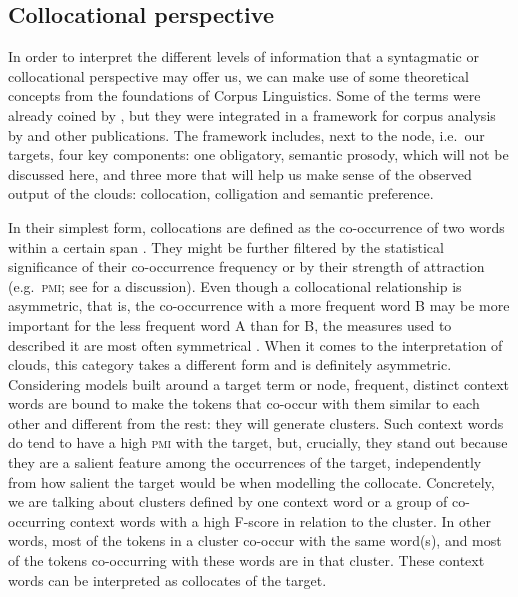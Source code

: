 \documentclass[
]{book}
\begin{document}
\hypertarget{collocationally}{%
\subsection{Collocational perspective}\label{collocationally}}

In order to interpret the different levels of information that a syntagmatic or collocational perspective may offer us, we can make use of some theoretical concepts from the foundations of Corpus Linguistics. Some of the terms were already coined by \textcite{firth_1957a}, but they were integrated in a framework for corpus analysis by \textcite[124-125]{sinclair_1998} and other publications. The framework includes, next to the node, i.e.~our targets, four key components: one obligatory, semantic prosody, which will not be discussed here, and three more that will help us make sense of the observed output of the clouds: collocation, colligation and semantic preference.

In their simplest form, collocations are defined as the co-occurrence of two words within a certain span \autocites[ 13]{firth_1957a}[ 170]{sinclair_1991}[ 15]{sinclair_1998}[ 124]{stubbs_2009}. They might be further filtered by the statistical significance of their co-occurrence frequency or by their strength of attraction (e.g.~\textsc{pmi}; see \textcite[122-133]{mcenery.hardie_2012} for a discussion). Even though a collocational relationship is asymmetric, that is, the co-occurrence with a more frequent word B may be more important for the less frequent word A than for B, the measures used to described it are most often symmetrical \autocite{gries_2013}.
When it comes to the interpretation of clouds, this category takes a different form and is definitely asymmetric. Considering models built around a target term or node, frequent, distinct context words are bound to make the tokens that co-occur with them similar to each other and different from the rest: they will generate clusters. Such context words do tend to have a high \textsc{pmi} with the target, but, crucially, they stand out because they are a salient feature among the occurrences of the target, independently from how salient the target would be when modelling the collocate.
Concretely, we are talking about clusters defined by one context word or a group of co-occurring context words with a high F-score in relation to the cluster. In other words, most of the tokens in a cluster co-occur with the same word(s), and most of the tokens co-occurring with these words are in that cluster. These context words can be interpreted as collocates of the target.
\end{document}
